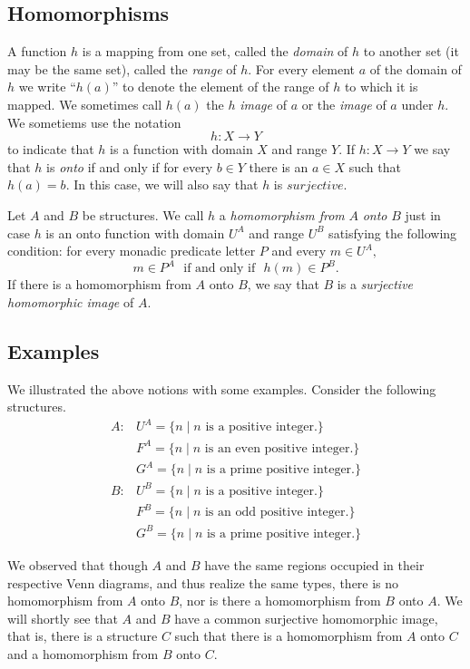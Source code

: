 \subsection{Homomorphisms}

A function $h$ is a mapping from one set, called the {\em domain} of $h$ to
another set (it may be the same set), called the {\em range} of $h.$ For every
element $a$ of the domain of $h$ we write ``$h(a)$'' to denote the element of
the 
range of $h$ to which it is mapped. We sometimes call $h(a)$ the $h$ {\em
image} of 
$a$ or the {\em image} of $a$ under $h.$ We sometiems use the notation
$$h: X \longrightarrow Y$$
to indicate that $h$ is a function with domain $X$ and range $Y.$
If $h: X \longrightarrow Y$ we say that $h$ is {\em onto} if and only if for
every 
$b\in Y$ there is an $a \in X$ such that $h(a)=b.$
In this case, we will also say that $h$ is $surjective.$

Let $A$ and $B$ be structures. We call $h$ a {\em homomorphism from}
$A$ {\em onto} $B$ just in case $h$ is an onto function with domain $U^A$
and range $U^B$ satisfying the following condition:
for every monadic predicate letter $P$ and every $m \in U^A,$
\[ m \in P^A\ \ \ \mbox{if and only if}\ \ \ h(m) \in P^B.\]
If there is a homomorphism from $A$ onto $B$, we say that $B$ is a {\em
surjective homomorphic image} of $A.$
\subsection{Examples}

We illustrated the above notions with some examples. Consider the following structures.
\[
\begin{array}{ll}
A: & U^A=\{n\mid n\mbox{ is a positive integer.}\}\\ 
 & F^A=\{n\mid n\mbox{ is an even positive integer.}\}\\ 
 & G^A=\{n\mid n\mbox{ is a prime positive integer.}\}
\end{array}
\]
\[
\begin{array}{ll}
B: & U^B=\{n\mid n\mbox{ is a positive integer.}\}\\ 
 & F^B=\{n\mid n\mbox{ is an odd positive integer.}\}\\ 
 & G^B=\{n\mid n\mbox{ is a prime positive integer.}\}
\end{array}
\]

We observed that though $A$ and $B$ have the same regions occupied in their respective Venn diagrams, and thus realize the same types, there is no homomorphism from $A$ onto $B$, nor is there a homomorphism from $B$ onto $A$. We will shortly see that $A$ and $B$ have a common surjective homomorphic image, that is, there is a structure $C$ such that there is a homomorphism from $A$ onto $C$ and a homomorphism from $B$ onto $C$.
